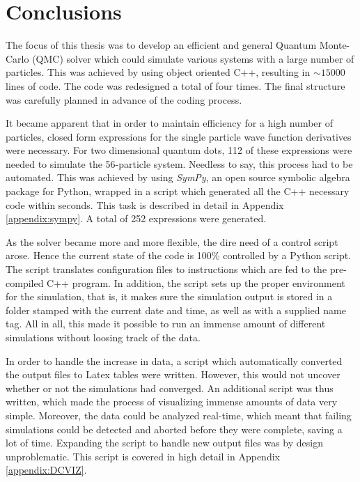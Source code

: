 \chapter{Conclusions}

The focus of this thesis was to develop an efficient and general Quantum Monte-Carlo (QMC) solver which could simulate various systems with a large number of particles. This was achieved by using object oriented C++, resulting in $\sim15000$ lines of code. The code was redesigned a total of four times. The final structure was carefully planned in advance of the coding process.

It became apparent that in order to maintain efficiency for a high number of particles, closed form expressions for the single particle wave function derivatives were necessary. For two dimensional quantum dots, 112 of these expressions were needed to simulate the 56-particle system. Needless to say, this process had to be automated. This was achieved by using \textit{SymPy}, an open source symbolic algebra package for Python, wrapped in a script which generated all the C++ necessary code within seconds. This task is described in detail in Appendix \ref{appendix:sympy}. A total of 252 expressions were generated.

As the solver became more and more flexible, the dire need of a control script arose. Hence the current state of the code is 100\% controlled by a Python script. The script translates configuration files to instructions which are fed to the pre-compiled C++ program. In addition, the script sets up the proper environment for the simulation, that is, it makes sure the simulation output is stored in a folder stamped with the current date and time, as well as with a supplied name tag. All in all, this made it possible to run an immense amount of different simulations without loosing track of the data.

In order to handle the increase in data, a script which automatically converted the output files to Latex tables were written. However, this would not uncover whether or not the simulations had converged. An additional script was thus written, which made the process of visualizing immense amounts of data very simple. Moreover, the data could be analyzed real-time, which meant that failing simulations could be detected and aborted before they were complete, saving a lot of time. Expanding the script to handle new output files was by design unproblematic. This script is covered in high detail in Appendix \ref{appendix:DCVIZ}.

